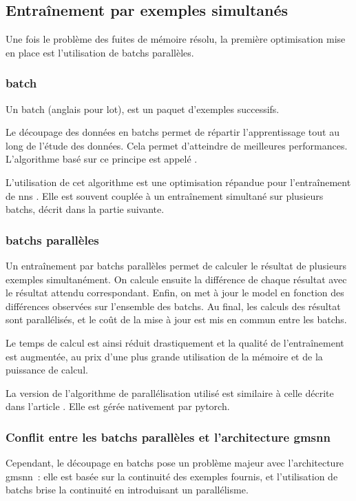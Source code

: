 
\newpage
\subsection{Entraînement par exemples simultanés} \label{subsec:optibatch}
Une fois le problème des fuites de mémoire résolu, la première optimisation mise en place est l'utilisation de \glspl{batch} parallèles.

\subsubsection{\Gls{batch}}
Un \gls{batch} (anglais pour lot), est un paquet d'exemples successifs.

Le découpage des données en \glspl{batch} permet de répartir l'apprentissage tout au long de l'étude des données.
Cela permet d'atteindre de meilleures performances.
L'algorithme basé sur ce principe est appelé  \autocite{batch}.

L'utilisation de cet algorithme est une optimisation répandue pour l'entraînement de \glspl{nn} \autocite{batch}.
Elle est souvent couplée à un entraînement simultané sur plusieurs \glspl{batch}, décrit dans la partie suivante.

\subsubsection{\Glspl{batch} parallèles}
Un entraînement par \glspl{batch} parallèles permet de calculer le résultat de plusieurs exemples simultanément.
On calcule ensuite la différence de chaque résultat avec le résultat attendu correspondant.
Enfin, on met à jour le \gls{model} en fonction des différences observées sur l'ensemble des \glspl{batch}.
Au final, les calculs des résultat sont parallélisés, et le coût de la mise à jour est mis en commun entre les \glspl{batch}.

Le temps de calcul est ainsi réduit drastiquement et la qualité de l'entraînement est augmentée, au prix d'une plus grande utilisation de la mémoire et de la puissance de calcul.

La version de l'algorithme de parallélisation utilisé est similaire à celle décrite dans l'article \autocite{batch_parallel}. Elle est gérée nativement par \gls{pytorch}.

\subsubsection{Conflit entre les \glspl{batch} parallèles et l'architecture \gls{gmsnn}}
Cependant, le découpage en \glspl{batch} pose un problème majeur avec l'architecture \gls{gmsnn}~: elle est basée sur la continuité des exemples fournis, et l'utilisation de \glspl{batch} brise la continuité en introduisant un parallélisme.

